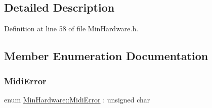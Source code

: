 \subsection{Detailed Description}


Definition at line 58 of file Min\+Hardware.\+h.



\subsection{Member Enumeration Documentation}
\mbox{\label{class_min_hardware_a54ab3625bd44e1b95ba30816a6923c4a}} 
\subsubsection{\texorpdfstring{Midi\+Error}{MidiError}}
{\footnotesize\ttfamily enum \hyperlink{class_min_hardware_a54ab3625bd44e1b95ba30816a6923c4a}{Min\+Hardware\+::\+Midi\+Error} \+: unsigned char}

